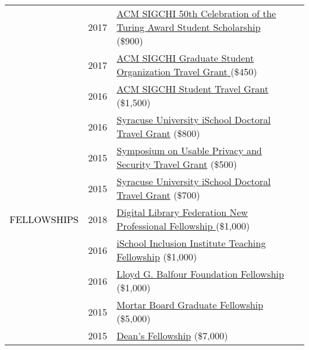 \documentclass[12pt]{article}
\begin{document}
{{\begin{longtable}{Rp{1.0in}p{0.25in}p{4.75in}}
& \footnotesize{2017} & \href{http://www.sigchi.org/news/sigchi-sponsors-students-to-attend-turing-award-celebration}{{ACM SIGCHI 50th Celebration of the Turing Award Student Scholarship} }(\$900) \\

& \footnotesize{2017} & \href{http://gradorg.syr.edu/travel-grant/}{{ACM SIGCHI Graduate Student Organization Travel Grant} }(\$450) \\

& \footnotesize{2016} & \href{http://www.sigchi.org/conferences/funding/student-travel-grant}{{ACM SIGCHI Student Travel Grant} }(\$1,500) \\

& \footnotesize{2016} & \href{https://ischool.syr.edu/research/grants-and-awards/}{{Syracuse University iSchool Doctoral Travel Grant}} (\$800) \\

& \footnotesize{2015} & \href{http://cups.cs.cmu.edu/soups/2015/cfp.php}{{Symposium on Usable Privacy and Security Travel Grant}} (\$500) \\

& \footnotesize{2015} & \href{https://ischool.syr.edu/research/grants-and-awards/}{{Syracuse University iSchool Doctoral Travel Grant}} (\$700) \\

\textcolor{black}{\footnotesize{\uppercase{Fellowships}}} & \footnotesize{2018} & \href{https://forum2018.diglib.org/fellowship-opportunities/fellows/}{{Digital Library Federation New Professional Fellowship }}(\$1,000) \\

& \footnotesize{2016} & \href{http://www.sis.pitt.edu/i3/phd-fellows/fellow-profiles.html}{{iSchool Inclusion Institute Teaching Fellowship}} (\$1,000) \\

& \footnotesize{2016} & \href{https://www.bankofamerica.com/philanthropic/foundation.go?fnId=31}{{Lloyd G. Balfour Foundation Fellowship}} (\$1,000) \\

& \footnotesize{2015} & \href{https://news.syr.edu/2015/07/ischool-student-awarded-5000-mortar-board-fellowship-22021/}{{Mortar Board Graduate Fellowship}} (\$5,000) \\

& \footnotesize{2015} & \href{https://news.syr.edu/2012/04/ischool-advisersu-trustee-creates-new-summer-ph-d-fellowships/}{{Dean’s Fellowship}} (\$7,000) \\


\end{longtable}}}
\end{document}
